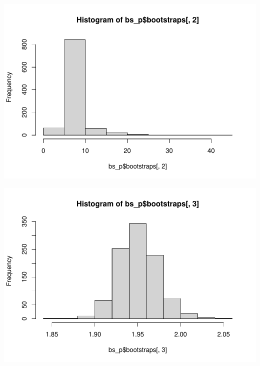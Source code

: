 \documentclass[
]{book}
\newenvironment{Shaded}{\begin{snugshade}}{\end{snugshade}}
\newcommand{\DecValTok}[1]{\textcolor[rgb]{0.00,0.00,0.81}{#1}}
\newcommand{\FunctionTok}[1]{\textcolor[rgb]{0.13,0.29,0.53}{\textbf{#1}}}
\newcommand{\NormalTok}[1]{#1}
\newcommand{\SpecialCharTok}[1]{\textcolor[rgb]{0.81,0.36,0.00}{\textbf{#1}}}
\begin{document}
\begin{Shaded}
\end{Shaded}

\includegraphics{bookdown-demo_files/figure-latex/unnamed-chunk-195-1.pdf}

\begin{Shaded}
\end{Shaded}

\includegraphics{bookdown-demo_files/figure-latex/unnamed-chunk-195-2.pdf}
\end{document}
